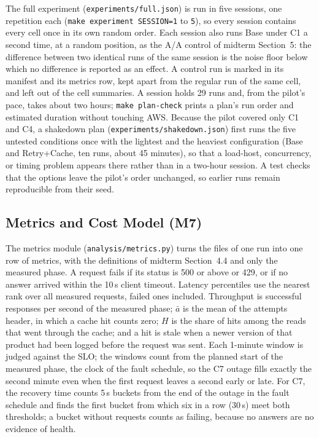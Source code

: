 \documentclass[10pt]{article}
\begin{document}
The full experiment (\texttt{experiments/full.json}) is run in five sessions,
one repetition each (\texttt{make experiment SESSION=1} to \texttt{5}), so
every session contains every cell once in its own random order. Each session
also runs Base under C1 a second time, at a random position, as the A/A
control of midterm Section~5: the difference between two identical runs of the
same session is the noise floor below which no difference is reported as an
effect. A control run is marked in its manifest and its metrics row, kept apart
from the regular run of the same cell, and left out of the cell summaries. A
session holds 29 runs and, from the pilot's pace, takes about two hours;
\texttt{make plan-check} prints a plan's run order and estimated duration
without touching AWS. Because the pilot covered only C1 and C4, a shakedown
plan (\texttt{experiments/shakedown.json}) first runs the five untested
conditions once with the lightest and the heaviest configuration (Base and
Retry+Cache, ten runs, about 45 minutes), so that a load-host, concurrency, or
timing problem appears there rather than in a two-hour session. A test checks
that the options leave the pilot's order unchanged, so earlier runs remain
reproducible from their seed.

\subsection{Metrics and Cost Model (M7)}
The metrics module (\texttt{analysis/metrics.py}) turns the files of one run
into one row of metrics, with the definitions of midterm Section~4.4 and only
the measured phase. A request fails if its status is 500 or above or 429, or
if no answer arrived within the 10\,s client timeout. Latency percentiles use
the nearest rank over all measured requests, failed ones included. Throughput
is successful responses per second of the measured phase; $\bar{a}$ is the
mean of the attempts header, in which a cache hit counts zero; $H$ is the share
of hits among the reads that went through the cache; and a hit is stale when a
newer version of that product had been logged before the request was sent.
Each 1-minute window is judged against the SLO; the windows count from the
planned start of the measured phase, the clock of the fault schedule, so the
C7 outage fills exactly the second minute even when the first request leaves a
second early or late. For C7, the recovery time
counts 5\,s buckets from the end of the outage in the fault schedule and finds
the first bucket from which six in a row (30\,s) meet both thresholds; a
bucket without requests counts as failing, because no answers are no evidence
of health.
\end{document}
